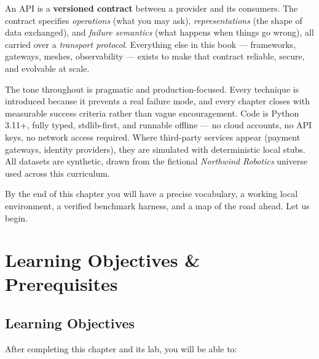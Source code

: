 \begin{keyconceptbox}
An API is a \textbf{versioned contract} between a provider and its consumers.
The contract specifies \emph{operations} (what you may ask), \emph{representations}
(the shape of data exchanged), and \emph{failure semantics} (what happens when
things go wrong), all carried over a \emph{transport protocol}. Everything else
in this book --- frameworks, gateways, meshes, observability --- exists to make
that contract reliable, secure, and evolvable at scale.
\end{keyconceptbox}

The tone throughout is pragmatic and production-focused. Every technique is
introduced because it prevents a real failure mode, and every chapter closes
with measurable success criteria rather than vague encouragement. Code is
Python 3.11+, fully typed, stdlib-first, and runnable offline --- no cloud
accounts, no API keys, no network access required. Where third-party services
appear (payment gateways, identity providers), they are simulated with
deterministic local stubs. All datasets are synthetic, drawn from the
fictional \emph{Northwind Robotics} universe used across this curriculum.

By the end of this chapter you will have a precise vocabulary, a working local
environment, a verified benchmark harness, and a map of the road ahead. Let us
begin.

\section{Learning Objectives \& Prerequisites}
\label{sec:ch0-objectives}

\subsection{Learning Objectives}

After completing this chapter and its lab, you will be able to:


